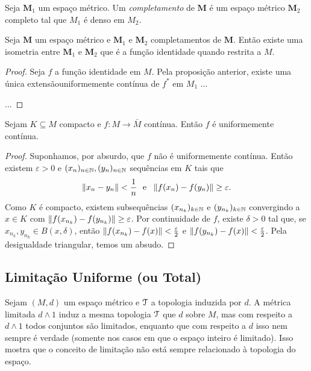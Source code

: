 \begin{defi}
Seja $\bm M_1$  um espaço métrico. Um \emph{completamento} de $\bm M$ é um espaço métrico $\bm M_2$ completo tal que $M_1$ é denso em $M_2$.
\end{defi}

\begin{prop}
Seja $\bm M$ um espaço métrico e $\bm M_1$ e $\bm M_2$ completamentos de $\bm M$. Então existe uma isometria entre $\bm M_1$ e $\bm M_2$ que é a função identidade quando restrita a $M$.
\end{prop}
\begin{proof}
	Seja $f$ a função identidade em $M$. Pela proposição anterior, existe uma única extensãouniformemente contínua de $f^*$ em $M_1$ ...
	
	...
\end{proof}


\begin{prop}
Sejam $K \subseteq M$ compacto e $f: M \to \bar M$ contínua. Então $f$ é uniformemente contínua.
\end{prop}
\begin{proof}
Suponhamos, por absurdo, que $f$ não é uniformemente contínua. Então existem $\varepsilon > 0$ e $(x_n)_{n \in \mathbb{N}},(y_n)_{n \in \mathbb{N}}$ sequências em $K$ tais que
	\begin{equation*}
	\left\Vert{x_n - y_n}\right\Vert < \frac{1}{n} \text{\ \ e\ \ } \left\Vert{f(x_n)-f(y_n)}\right\Vert \geq \varepsilon.
	\end{equation*}
Como $K$ é compacto, existem subsequências $(x_{n_k})_{k \in \mathbb{N}}$  e $(y_{n_k})_{k \in \mathbb{N}}$ convergindo a $x \in K$ com $\left\Vert{f(x_{n_k})-f(y_{n_k})}\right\Vert \geq \varepsilon$. Por continuidade de $f$, existe $\delta > 0$ tal que, se $x_{n_k},y_{n_k} \in B(x,\delta)$, então $\left\Vert{f(x_{n_k})-f(x)}\right\Vert < \frac{\varepsilon}{2}$ e $\left\Vert{f(y_{n_k})-f(x)}\right\Vert < \frac{\varepsilon}{2}$. Pela desigualdade triangular, temos um absudo.
\end{proof}


\subsection{Limitação Uniforme (ou Total)}

Sejam $(M,d)$ um espaço métrico e $\mathcal{T}$ a topologia induzida por $d$. A métrica limitada $d \wedge 1$ induz a mesma topologia $\mathcal{T}$ que $d$ sobre $M$, mas com respeito a $d \wedge 1$ todos conjuntos são limitados, enquanto que com respeito a $d$ isso nem sempre é verdade (somente nos casos em que o espaço inteiro é limitado). Isso mostra que o conceito de limitação não está sempre relacionado à topologia do espaço.

